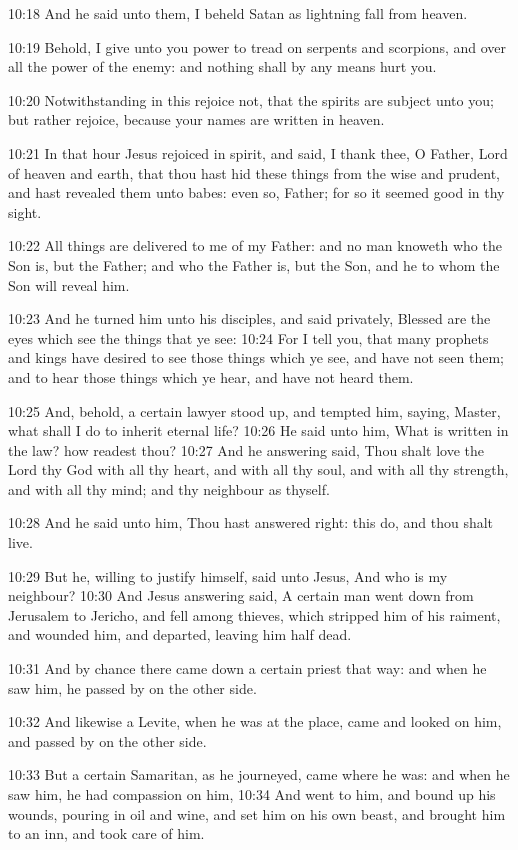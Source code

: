 10:18 And he said unto them, I beheld Satan as lightning fall from
heaven.

10:19 Behold, I give unto you power to tread on serpents and
scorpions, and over all the power of the enemy: and nothing shall by
any means hurt you.

10:20 Notwithstanding in this rejoice not, that the spirits are
subject unto you; but rather rejoice, because your names are written
in heaven.

10:21 In that hour Jesus rejoiced in spirit, and said, I thank thee, O
Father, Lord of heaven and earth, that thou hast hid these things from
the wise and prudent, and hast revealed them unto babes: even so,
Father; for so it seemed good in thy sight.

10:22 All things are delivered to me of my Father: and no man knoweth
who the Son is, but the Father; and who the Father is, but the Son,
and he to whom the Son will reveal him.

10:23 And he turned him unto his disciples, and said privately,
Blessed are the eyes which see the things that ye see: 10:24 For I
tell you, that many prophets and kings have desired to see those
things which ye see, and have not seen them; and to hear those things
which ye hear, and have not heard them.

10:25 And, behold, a certain lawyer stood up, and tempted him, saying,
Master, what shall I do to inherit eternal life?  10:26 He said unto
him, What is written in the law? how readest thou?  10:27 And he
answering said, Thou shalt love the Lord thy God with all thy heart,
and with all thy soul, and with all thy strength, and with all thy
mind; and thy neighbour as thyself.

10:28 And he said unto him, Thou hast answered right: this do, and
thou shalt live.

10:29 But he, willing to justify himself, said unto Jesus, And who is
my neighbour?  10:30 And Jesus answering said, A certain man went down
from Jerusalem to Jericho, and fell among thieves, which stripped him
of his raiment, and wounded him, and departed, leaving him half dead.

10:31 And by chance there came down a certain priest that way: and
when he saw him, he passed by on the other side.

10:32 And likewise a Levite, when he was at the place, came and looked
on him, and passed by on the other side.

10:33 But a certain Samaritan, as he journeyed, came where he was: and
when he saw him, he had compassion on him, 10:34 And went to him, and
bound up his wounds, pouring in oil and wine, and set him on his own
beast, and brought him to an inn, and took care of him.

